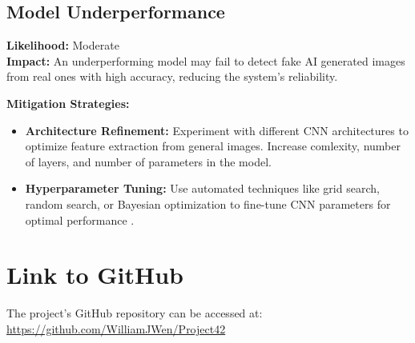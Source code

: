 \documentclass{article} %
\begin{document}
\subsection{Model Underperformance}
\textbf{Likelihood:} Moderate \\
\textbf{Impact:} An underperforming model may fail to detect fake AI generated images from real ones with high accuracy, reducing the system's reliability.

\textbf{Mitigation Strategies:}
\begin{itemize}
    \item \textbf{Architecture Refinement:} Experiment with different CNN architectures to optimize feature extraction from general images. Increase comlexity, number of layers, and number of parameters in the model.
    \item \textbf{Hyperparameter Tuning:} Use automated techniques like grid search, random search, or Bayesian optimization to fine-tune CNN parameters for optimal performance \citep{bergstra2011}.
\end{itemize}

\section{Link to GitHub}
The project's GitHub repository can be accessed at:  
\href{https://github.com/WilliamJWen/Project42}{https://github.com/WilliamJWen/Project42}


\label{last_page}



\end{document}
